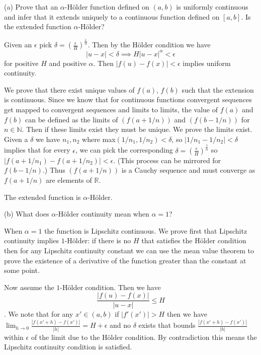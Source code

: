 \documentclass{amsart}
\begin{document}
\bigskip

(a) Prove that an $\alpha$-H\"{o}lder function defined on $(a, b)$ is uniformly continuous and infer 
that it extends uniquely to a continuous function defined on $[a, b]$. Is the extended function $\alpha$-H\"{o}lder?

\medskip \noindent Given an $\epsilon$ pick $\delta = (\frac{\epsilon}{H})^{\frac{1}{\alpha}}$. Then by the H\"{o}lder
condition we have $$|u-x|<\delta\implies H|u-x|^{\alpha}<\epsilon$$ for positive $H$ and positive $\alpha$. Then $|f(u)-f(x)|<\epsilon$
implies uniform continuity. 

\medskip \noindent We prove that there exist unique values of $f(a)$, $f(b)$ such that the extension is continuous. Since we know that 
for continuous functions convergent sequences get mapped to convergent sequences and limits to limits, the value of $f(a)$ and $f(b)$ 
can be defined as the limits of $(f(a + 1/n))$ and $(f(b - 1/n))$ for $n\in\mathbb{N}$. Then if these limits exist they must be unique. 
We prove the limits exist. Given a $\delta$ we have $n_1, n_2$ where max$(1/n_1, 1/n_2) < \delta$, so $|1/n_1-1/n_2|<\delta$ implies
that for every $\epsilon$, we can pick the corresponding $\delta=(\frac{\epsilon}{H})^{\frac{1}{\alpha}}$ so $|f(a+1/n_1)-f(a+1/n_2)|<\epsilon$. (This process can be 
mirrored for $f(b-1/n)$.) Thus $(f(a+1/n))$ is a Cauchy sequence and must converge as $f(a+1/n)$ are elements of $\mathbb{R}$. 

\medskip \noindent The extended function is $\alpha$-H\"{o}lder. 

\bigskip

(b) What does $\alpha$-H\"{o}lder continuity mean when $\alpha = 1$?

\medskip \noindent When $\alpha=1$ the function is Lipschitz continuous. We prove first that Lipschitz continuity
implies $1$-H\"{o}lder: if there is no $H$ that satisfies the H\"{o}lder condition then for any Lipschitz continuity
constant we can use the mean value theorem to prove the existence of a derivative of the function greater than the constant at
some point. 

\medskip \noindent Now assume the $1$-H\"{o}lder condition. Then we have $$\frac{|f(u)-f(x)|}{|u-x|}\leq H$$. We note that for any $x'\in (a,b)$
if $|f'(x')|>H$ then we have $\lim_{h\rightarrow 0}\frac{|f(x'+h)-f(x')|}{|h|} = H+\epsilon$ and no $\delta$ exists that bounds
$\frac{|f(x'+h)-f(x')|}{|h|}$ within $\epsilon$ of the limit due to the H\"{o}lder condition. By contradiction this means the Lipschitz continuity
condition is satisfied.
\end{document}
